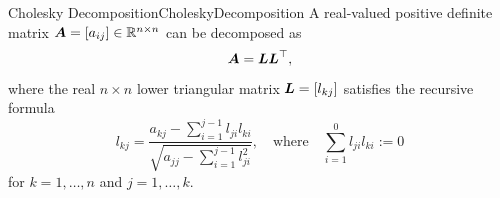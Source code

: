 \begin{thm}{Cholesky Decomposition}{CholeskyDecomposition}
	A real-valued positive definite matrix \(\boldsymbol{A} = [a_{ij}] \in \mathbb{R}^{n \times n}\) can be decomposed as
	\begin{equation}
		\label{CholeskyFactorization}
		\boldsymbol{A} = \boldsymbol{L} \boldsymbol{L}^\top,
	\end{equation}
	where the real \(n \times n\) lower triangular matrix \(\boldsymbol{L} = [l_{kj}]\) satisfies the recursive formula
	\begin{equation}
		\label{CholeskyRecursiveFormula}
		l_{kj} = \frac{a_{kj} - \sum_{i=1}^{j-1} l_{ji} l_{ki}}{\sqrt{a_{jj} - \sum_{i=1}^{j-1} l_{ji}^2}}, \quad \text{where} \quad \sum_{i=1}^0 l_{ji} l_{ki} := 0
	\end{equation}
	for \(k = 1, \dots, n\) and \(j = 1, \dots, k\).
\end{thm}

